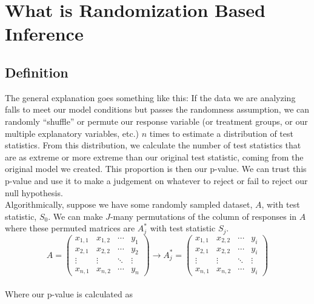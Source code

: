 
\section{What is Randomization Based Inference}
\subsection{Definition}
The general explanation goes something like this: If the data we are analyzing falls to meet our model conditions but passes the randomness assumption, we can randomly “shuffle” or permute our response variable (or treatment groups, or our multiple explanatory variables, etc.) $n$ times to estimate a distribution of test statistics. From this distribution, we calculate the number of test statistics that are as extreme or more extreme than our original test statistic, coming from the original model we created. This proportion is then our p-value. We can trust this p-value and use it to make a judgement on whatever to reject or fail to reject our null hypothesis.
\newline\\
Algorithmically, suppose we have some randomly sampled dataset, $A$, with test statistic, $S_0$. We can make $J$-many permutations of the column of responses in $A$ where these permuted matrices are $A_j^*$ with test statistic $S_j$.
$$
    A=\begin{pmatrix}
        x_{1,1} & x_{1,2} & \cdots & y_{1} \\
        x_{2,1} & x_{2,2} & \cdots & y_{2} \\
        \vdots  & \vdots  & \ddots & \vdots  \\
        x_{n,1} & x_{n,2} & \cdots & y_{n} 
    \end{pmatrix}\longrightarrow
    A_j^*=\begin{pmatrix}
        x_{1,1} & x_{2,2} & \cdots & y_{i} \\
        x_{2,1} & x_{2,2} & \cdots & y_{i} \\
        \vdots  & \vdots  & \ddots & \vdots  \\
        x_{n,1} & x_{n,2} & \cdots & y_{i} 
    \end{pmatrix} 
$$
\\
Where our p-value is calculated as 


